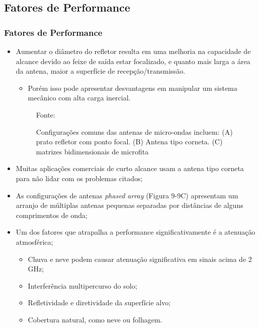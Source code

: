 \documentclass[xcolor=dvipsnames, aspectratio=169]{beamer}
\begin{document}
    \subsection[Fatores de Performance]{Fatores de Performance} 
    \begin{frame}
    \frametitle{Fatores de Performance}
        \begin{itemize}
            \item Aumentar o diâmetro do refletor resulta em uma melhoria na capacidade de alcance devido ao feixe de saída estar focalizado, e quanto mais larga a área da antena, maior a superfície de recepção/transmissão.
            \begin{itemize}
                \item Porém isso pode apresentar desvantagens em manipular um sistema mecânico com alta carga inercial.
            \end{itemize}
            		
		\begin{figure}
            \centering
            {Fonte: \cite{everett1995sensors}}
            \caption{Configurações comuns das antenas de micro-ondas incluem: (A) prato refletor com ponto focal. (B) Antena tipo corneta. (C) matrizes bidimensionais de microfita}
            \label{fig:MR_commom_config}
        \end{figure}
        
            \item Muitas aplicações comerciais de curto alcance usam a antena tipo corneta para não lidar com os problemas citados;
            \item As configurações de antenas \textit{phased array} (Figura 9-9C) apresentam um arranjo de múltiplas antenas pequenas separadas por distâncias de alguns comprimentos de onda;
            \item Um dos fatores que atrapalha a performance significativamente é a atenuação atmosférica;
            \begin{itemize}
                \item Chuva e neve podem causar atenuação significativa em sinais acima de 2 GHz;
                \item Interferência multipercurso do solo; 
                \item Refletividade e diretividade da superfície alvo;
                \item Cobertura natural, como neve ou folhagem.
            \end{itemize}
        \end{itemize}
    \end{frame}
\end{document}
